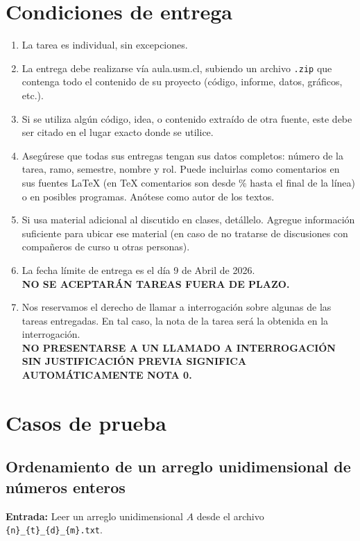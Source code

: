 \documentclass[11pt,spanish]{article}
\begin{document}
\section{Condiciones de entrega}
\begin{enumerate}[(1)]
  \item La tarea es individual, sin excepciones.
  \item La entrega debe realizarse vía aula.usm.cl, subiendo un archivo \verb|.zip| que contenga todo el contenido de su proyecto (código, informe, datos, gráficos, etc.).
  \item Si se utiliza algún código, idea, o contenido extraído de otra fuente, este debe ser citado en el lugar exacto donde se utilice.
  \item Asegúrese que todas sus entregas tengan sus datos completos: número de la tarea, ramo, semestre, nombre y rol. Puede incluirlas como comentarios en sus fuentes \LaTeX{} (en \TeX{} comentarios son desde \% hasta el final de la línea) o en posibles programas. Anótese como autor de los textos.
  \item Si usa material adicional al discutido en clases, detállelo. Agregue información suficiente para ubicar ese material (en caso de no tratarse de discusiones con compañeros de curso u otras personas).
  \item La fecha límite de entrega es el día 9 de Abril de 2026. \\ \textbf{NO SE ACEPTARÁN TAREAS FUERA DE PLAZO.}
  \item Nos reservamos el derecho de llamar a interrogación sobre algunas de las tareas entregadas. En tal caso, la nota de la tarea será la obtenida en la interrogación. \\ \textbf{NO PRESENTARSE A UN LLAMADO A INTERROGACIÓN SIN JUSTIFICACIÓN PREVIA SIGNIFICA AUTOMÁTICAMENTE NOTA 0.}
\end{enumerate}

\newpage

\appendix

\section{Casos de prueba}

\subsection{Ordenamiento de un arreglo unidimensional de números enteros}

\textbf{Entrada:} Leer un arreglo unidimensional $A$ desde el archivo \verb|{n}_{t}_{d}_{m}.txt|.
\end{document}
